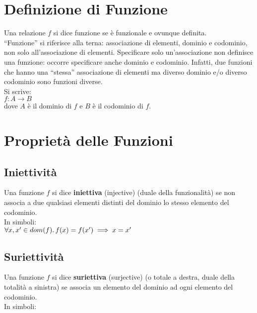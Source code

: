 \documentclass[a4paper, twoside, italian, 11pt]{book}
\begin{document}
\section{Definizione di Funzione}

Una relazione $f$ si dice funzione se è funzionale e ovunque definita. \\

\noindent
``Funzione'' si riferisce alla terna: associazione di elementi, dominio e codominio, non solo all'associazione di elementi. Specificare solo un'associazione non definisce una funzione: occorre specificare anche dominio e codominio. Infatti, due funzioni che hanno una ``stessa'' associazione di elementi ma diverso dominio e/o diverso codominio sono funzioni diverse. \\

\noindent
Si scrive: \\
$f : A \rightarrow B$ \\
dove $A$ è il dominio di $f$ e $B$ è il codominio di $f$.


\section{Proprietà delle Funzioni}


\subsection{Iniettività}

Una funzione $f$ si dice \textbf{iniettiva} (injective) (duale della funzionalità) se non associa a due qualsiasi elementi distinti del dominio lo stesso elemento del codominio. \\

\noindent
In simboli: \\

$\forall x, x' \in dom(f) \ldotp f(x) = f(x') \implies x = x'$


\subsection{Suriettività}

Una funzione $f$ si dice \textbf{suriettiva} (surjective) (o totale a destra, duale della totalità a sinistra) se associa un elemento del dominio ad ogni elemento del codominio. \\

\noindent
In simboli: \\
\end{document}
